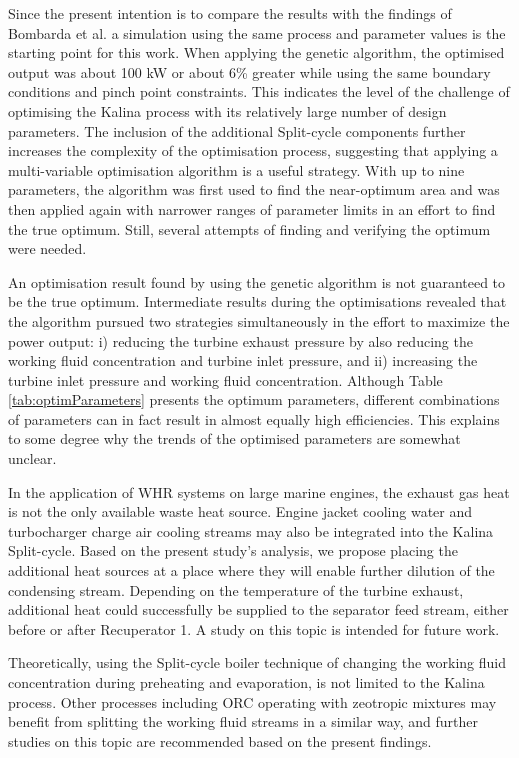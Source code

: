 \documentclass[review,3p]{elsarticle}
\begin{document}
Since the present intention is to compare the results with the findings of Bombarda et al. \cite{Bombarda2010b} a simulation using the same process and parameter values is the starting point for this work. When applying the genetic algorithm, the optimised output was about 100 kW or about 6\% greater while using the same boundary conditions and pinch point constraints. This indicates the level of the challenge of optimising the Kalina process with its relatively large number of design parameters. The inclusion of the additional Split-cycle components further increases the complexity of the optimisation process, suggesting that applying a multi-variable optimisation algorithm is a useful strategy. With up to nine parameters, the algorithm was first used to find the near-optimum area and was then applied again with narrower ranges of parameter limits in an effort to find the true optimum. Still, several attempts of finding and verifying the optimum were needed.

An optimisation result found by using the genetic algorithm is not guaranteed to be the true optimum. Intermediate results during the optimisations revealed that the algorithm pursued two strategies simultaneously in the effort to maximize the power output: i) reducing the turbine exhaust pressure by also reducing the working fluid concentration and turbine inlet pressure, and ii) increasing the turbine inlet pressure and working fluid concentration. Although Table \ref{tab:optimParameters} presents the optimum parameters, different combinations of parameters can in fact result in almost equally high efficiencies. This explains to some degree why the trends of the optimised parameters are somewhat unclear. 

In the application of WHR systems on large marine engines, the exhaust gas heat is not the only available waste heat source. Engine jacket cooling water and turbocharger charge air cooling streams may also be integrated into the Kalina Split-cycle. Based on the present study's analysis, we propose placing the additional heat sources at a place where they will enable further dilution of the condensing stream. Depending on the temperature of the turbine exhaust, additional heat could successfully be supplied to the separator feed stream, either before or after Recuperator 1. A study on this topic is intended for future work.


Theoretically, using the Split-cycle boiler technique of changing the working fluid concentration during preheating and evaporation, is not limited to the Kalina process. Other processes including ORC operating with zeotropic mixtures may benefit from splitting the working fluid streams in a similar way, and further studies on this topic are recommended based on the present findings. 
\end{document}
